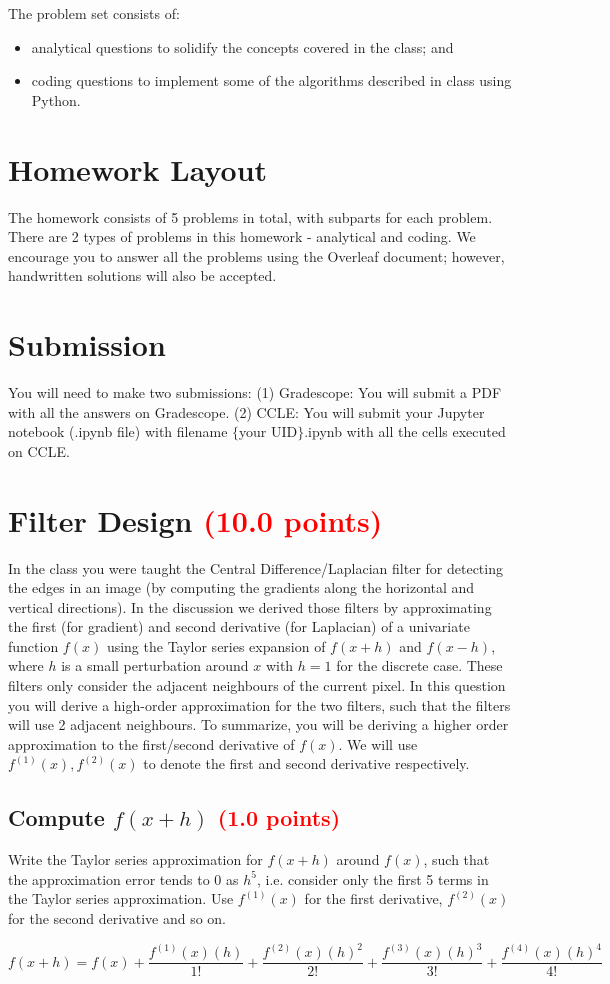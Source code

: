 \documentclass[answers]{exam}
\newcommand{\mypoints}[1]{\textcolor{red}{(#1 points)}}
\begin{document}
The problem set consists of: 
\begin{itemize}
    \item analytical questions to solidify the concepts covered in the class; and
    \item coding questions to implement some of the algorithms described in class using Python.
\end{itemize}

\section*{Homework Layout}
The homework consists of 5 problems in total, with subparts for each problem. There are 2 types of problems in this homework - analytical and coding. We encourage you to answer all the problems using the Overleaf document; however, handwritten solutions will also be accepted. 

\section*{Submission}

You will need to make two submissions: (1) Gradescope: You will submit a PDF with all the answers on Gradescope. (2) CCLE: You will submit your Jupyter notebook (.ipynb file) with filename $\{$your UID$\}$.ipynb with all the cells executed on CCLE. 


\newpage
\section{Filter Design \mypoints{10.0}}
In the class you were taught the Central Difference/Laplacian filter for detecting the edges in an image (by computing the gradients along the horizontal and vertical directions). In the discussion we derived those filters by approximating the first (for gradient) and second derivative (for Laplacian) of a univariate function $f(x)$ using the Taylor series expansion of $f(x+h)$ and $f(x-h)$, where $h$ is a small perturbation around $x$ with $h=1$ for the discrete case. These filters only consider the adjacent neighbours of the current pixel. In this question you will derive a high-order approximation for the two filters, such that the filters will use 2 adjacent neighbours. To summarize, you will be deriving a higher order approximation to the first/second derivative of $f(x)$. We will use $f^{(1)}(x),f^{(2)}(x)$ to denote the first and second derivative respectively.

\subsection{Compute $f(x+h)$ \mypoints{1.0}}
Write the Taylor series approximation for $f(x+h)$ around $f(x)$, such that the approximation error tends to 0 as $h^5$, i.e. consider only the first 5 terms in the Taylor series approximation. Use $f^{(1)}(x)$ for the first derivative, $f^{(2)}(x)$ for the second derivative and so on. 
\begin{solution}
$f(x+h) = f(x) + \dfrac{f^{(1)}(x)(h)}{1!} + \dfrac{f^{(2)}(x)(h)^2}{2!}+ \dfrac{f^{(3)}(x)(h)^3}{3!}+ \dfrac{f^{(4)}(x)(h)^4}{4!}$
\end{solution}
\end{document}

